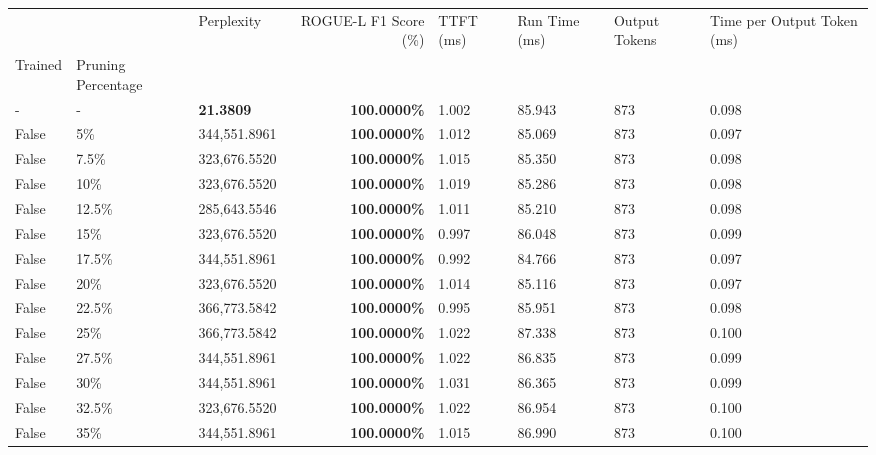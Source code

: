 \begin{table}[H]
{\label{tab:evaluation-pipeline-6-untrained}
\begin{tabular}{lllrllll}
\toprule
 &  & Perplexity & ROGUE-L F1 Score (\%) & TTFT (ms) & Run Time (ms) & Output Tokens & Time per Output Token (ms) \\
Trained & Pruning Percentage &  &  &  &  &  &  \\
\midrule
- & - & \bfseries 21.3809 & \bfseries 100.0000\% & 1.002 & 85.943 & 873 & 0.098 \\
\cline{1-8} \cline{2-8}
False & 5\% & 344,551.8961 & \bfseries \color{red} 100.0000\% & 1.012 & 85.069 & 873 & 0.097 \\
\cline{1-8} \cline{2-8}
False & 7.5\% & 323,676.5520 & \bfseries \color{red} 100.0000\% & 1.015 & 85.350 & 873 & 0.098 \\
\cline{1-8} \cline{2-8}
False & 10\% & 323,676.5520 & \bfseries \color{red} 100.0000\% & 1.019 & 85.286 & 873 & 0.098 \\
\cline{1-8} \cline{2-8}
False & 12.5\% & 285,643.5546 & \bfseries \color{red} 100.0000\% & 1.011 & 85.210 & 873 & 0.098 \\
\cline{1-8} \cline{2-8}
False & 15\% & 323,676.5520 & \bfseries \color{red} 100.0000\% & 0.997 & 86.048 & 873 & 0.099 \\
\cline{1-8} \cline{2-8}
False & 17.5\% & 344,551.8961 & \bfseries \color{red} 100.0000\% & 0.992 & 84.766 & 873 & 0.097 \\
\cline{1-8} \cline{2-8}
False & 20\% & 323,676.5520 & \bfseries \color{red} 100.0000\% & 1.014 & 85.116 & 873 & 0.097 \\
\cline{1-8} \cline{2-8}
False & 22.5\% & 366,773.5842 & \bfseries \color{red} 100.0000\% & 0.995 & 85.951 & 873 & 0.098 \\
\cline{1-8} \cline{2-8}
False & 25\% & 366,773.5842 & \bfseries \color{red} 100.0000\% & 1.022 & 87.338 & 873 & 0.100 \\
\cline{1-8} \cline{2-8}
False & 27.5\% & 344,551.8961 & \bfseries \color{red} 100.0000\% & 1.022 & 86.835 & 873 & 0.099 \\
\cline{1-8} \cline{2-8}
False & 30\% & 344,551.8961 & \bfseries \color{red} 100.0000\% & 1.031 & 86.365 & 873 & 0.099 \\
\cline{1-8} \cline{2-8}
False & 32.5\% & 323,676.5520 & \bfseries \color{red} 100.0000\% & 1.022 & 86.954 & 873 & 0.100 \\
\cline{1-8} \cline{2-8}
False & 35\% & 344,551.8961 & \bfseries \color{red} 100.0000\% & 1.015 & 86.990 & 873 & 0.100 \\

\end{tabular}}
\end{table}
